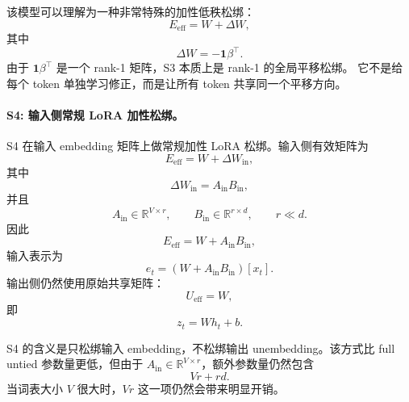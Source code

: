 该模型可以理解为一种非常特殊的加性低秩松绑：
\begin{equation}
    E_{\mathrm{eff}} = W + \Delta W,
\end{equation}
其中
\begin{equation}
    \Delta W = -\mathbf{1}\beta^\top.
\end{equation}
由于 $\mathbf{1}\beta^\top$ 是一个 rank-1 矩阵，S3 本质上是 rank-1 的全局平移松绑。
它不是给每个 token 单独学习修正，而是让所有 token 共享同一个平移方向。

\paragraph{S4: 输入侧常规 LoRA 加性松绑。}
S4 在输入 embedding 矩阵上做常规加性 LoRA 松绑。输入侧有效矩阵为
\begin{equation}
    E_{\mathrm{eff}} = W + \Delta W_{\mathrm{in}},
\end{equation}
其中
\begin{equation}
    \Delta W_{\mathrm{in}} = A_{\mathrm{in}}B_{\mathrm{in}},
\end{equation}
并且
\begin{equation}
    A_{\mathrm{in}} \in \mathbb{R}^{V \times r}, \qquad
    B_{\mathrm{in}} \in \mathbb{R}^{r \times d}, \qquad
    r \ll d.
\end{equation}
因此
\begin{equation}
    E_{\mathrm{eff}} = W + A_{\mathrm{in}}B_{\mathrm{in}},
\end{equation}
输入表示为
\begin{equation}
    e_t = \left(W + A_{\mathrm{in}}B_{\mathrm{in}}\right)[x_t].
\end{equation}
输出侧仍然使用原始共享矩阵：
\begin{equation}
    U_{\mathrm{eff}} = W,
\end{equation}
即
\begin{equation}
    z_t = W h_t + b.
\end{equation}

S4 的含义是只松绑输入 embedding，不松绑输出 unembedding。该方式比 full untied
参数量更低，但由于 $A_{\mathrm{in}} \in \mathbb{R}^{V \times r}$，额外参数量仍然包含
\begin{equation}
    Vr + rd.
\end{equation}
当词表大小 $V$ 很大时，$Vr$ 这一项仍然会带来明显开销。

